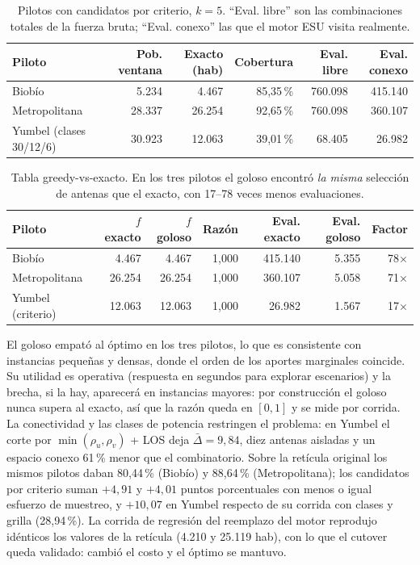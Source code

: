 \documentclass[12pt,letterpaper]{article}
\begin{document}
\begin{table}[H]
\centering\small
\begin{tabular}{lrrrrr}
\toprule
\textbf{Piloto} & \textbf{Pob. ventana} & \textbf{Exacto (hab)} & \textbf{Cobertura} & \textbf{Eval. libre} & \textbf{Eval. conexo} \\
\midrule
Biobío & 5.234 & 4.467 & 85,35\,\% & 760.098 & 415.140 \\
Metropolitana & 28.337 & 26.254 & 92,65\,\% & 760.098 & 360.107 \\
Yumbel (clases 30/12/6) & 30.923 & 12.063 & 39,01\,\% & 68.405 & 26.982 \\
\bottomrule
\end{tabular}
\caption{Pilotos con candidatos por criterio, $k=5$. ``Eval. libre'' son las combinaciones totales de la fuerza bruta; ``Eval. conexo'' las que el motor ESU visita realmente.}
\label{tab:pilotos}
\end{table}

\begin{table}[H]
\centering\small
\begin{tabular}{lrrrrrr}
\toprule
\textbf{Piloto} & $f$ \textbf{exacto} & $f$ \textbf{goloso} & \textbf{Razón} & \textbf{Eval. exacto} & \textbf{Eval. goloso} & \textbf{Factor} \\
\midrule
Biobío & 4.467 & 4.467 & 1,000 & 415.140 & 5.355 & 78$\times$ \\
Metropolitana & 26.254 & 26.254 & 1,000 & 360.107 & 5.058 & 71$\times$ \\
Yumbel (criterio) & 12.063 & 12.063 & 1,000 & 26.982 & 1.567 & 17$\times$ \\
\bottomrule
\end{tabular}
\caption{Tabla greedy-vs-exacto. En los tres pilotos el goloso encontró \emph{la misma} selección de antenas que el exacto, con 17--78 veces menos evaluaciones.}
\label{tab:greedy}
\end{table}

El goloso empató al óptimo en los tres pilotos, lo que es consistente con instancias pequeñas y densas, donde el orden de los aportes marginales coincide. Su utilidad es operativa (respuesta en segundos para explorar escenarios) y la brecha, si la hay, aparecerá en instancias mayores: por construcción el goloso nunca supera al exacto, así que la razón queda en $[0, 1]$ y se mide por corrida. La conectividad y las clases de potencia restringen el problema: en Yumbel el corte por $\min(\rho_u, \rho_v)$ + LOS deja $\bar{\Delta} = 9{,}84$, diez antenas aisladas y un espacio conexo 61\,\% menor que el combinatorio. Sobre la retícula original los mismos pilotos daban 80,44\,\% (Biobío) y 88,64\,\% (Metropolitana); los candidatos por criterio suman $+4{,}91$ y $+4{,}01$ puntos porcentuales con menos o igual esfuerzo de muestreo, y $+10{,}07$ en Yumbel respecto de su corrida con clases y grilla (28,94\,\%). La corrida de regresión del reemplazo del motor reprodujo idénticos los valores de la retícula (4.210 y 25.119 hab), con lo que el cutover queda validado: cambió el costo y el óptimo se mantuvo.
\end{document}
